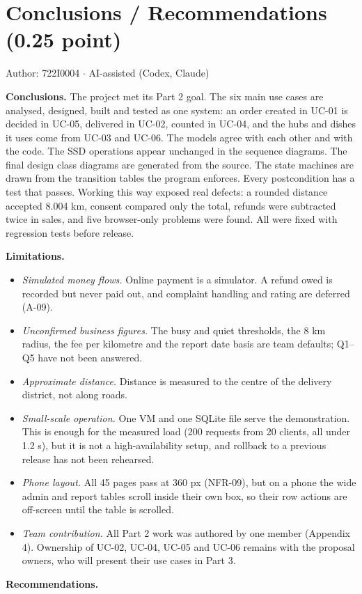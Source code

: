 \section*{Conclusions / Recommendations (0.25 point)}
Author: 722I0004 \ensuremath{\cdot} AI-assisted (Codex, Claude)

\textbf{Conclusions.} The project met its Part 2 goal. The six main use cases are analysed, designed, built and tested as one system: an order created in UC-01 is decided in UC-05, delivered in UC-02, counted in UC-04, and the hubs and dishes it uses come from UC-03 and UC-06. The models agree with each other and with the code. The SSD operations appear unchanged in the sequence diagrams. The final design class diagrams are generated from the source. The state machines are drawn from the transition tables the program enforces. Every postcondition has a test that passes. Working this way exposed real defects: a rounded distance accepted 8.004 km, consent compared only the total, refunds were subtracted twice in sales, and five browser-only problems were found. All were fixed with regression tests before release.

\textbf{Limitations.}

\begin{itemize}
\item \emph{Simulated money flows.} Online payment is a simulator. A refund owed is recorded but never paid out, and complaint handling and rating are deferred (A-09).

\item \emph{Unconfirmed business figures.} The busy and quiet thresholds, the 8 km radius, the fee per kilometre and the report date basis are team defaults; Q1--Q5 have not been answered.

\item \emph{Approximate distance.} Distance is measured to the centre of the delivery district, not along roads.

\item \emph{Small-scale operation.} One VM and one SQLite file serve the demonstration. This is enough for the measured load (200 requests from 20 clients, all under 1.2 s), but it is not a high-availability setup, and rollback to a previous release has not been rehearsed.

\item \emph{Phone layout.} All 45 pages pass at 360 px (NFR-09), but on a phone the wide admin and report tables scroll inside their own box, so their row actions are off-screen until the table is scrolled.

\item \emph{Team contribution.} All Part 2 work was authored by one member (Appendix 4). Ownership of UC-02, UC-04, UC-05 and UC-06 remains with the proposal owners, who will present their use cases in Part 3.

\end{itemize}
\textbf{Recommendations.}

